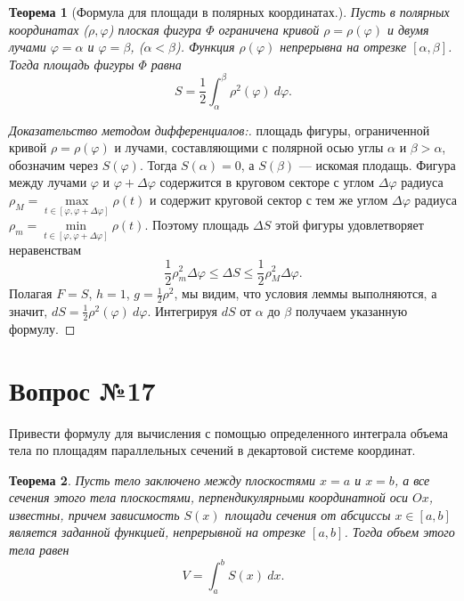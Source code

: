 \documentclass[12pt]{report}
\numberwithin{equation}{section}
\newtheorem{theorem}{Теорема}[section]
\begin{document}
\begin{theorem}[Формула для площади в полярных координатах.] \label{th:16:1}
Пусть в полярных координатах ($\rho, \varphi$) плоская фигура $\Phi$ ограничена кривой $\rho = \rho(\varphi)$ и двумя лучами $\varphi = \alpha$ и $\varphi = \beta$, ($\alpha < \beta$). Функция $\rho(\varphi)$ непрерывна на отрезке $[\alpha, \beta]$. Тогда площадь фигуры $\Phi$ равна
\[ S = \frac{1}{2}\int_{\alpha}^{\beta} \rho^2(\varphi)~d\varphi.\]
\end{theorem}
\begin{proof}[Доказательство методом дифференциалов:] площадь фигуры, ограниченной кривой $\rho = \rho(\varphi)$ и лучами, составляющими с полярной осью углы $\alpha$ и $\beta > \alpha$, обозначим через $S(\varphi)$. Тогда $S(\alpha) = 0$, а $S(\beta)$ --- искомая плодащь. Фигура между лучами $\varphi$ и $\varphi + \Delta \varphi$ содержится в круговом секторе с углом $\Delta \varphi$ радиуса $\rho_M = \max\limits_{t \in [\varphi, \varphi + \Delta \varphi] }\rho(t)$ и содержит круговой сектор с тем же углом $\Delta \varphi$ радиуса $\rho_m = \min\limits_{t \in [\varphi, \varphi + \Delta \varphi]} \rho(t)$. Поэтому площадь $\Delta S$ этой фигуры удовлетворяет неравенствам
\[ \frac{1}{2} \rho^2_m \Delta \varphi \leqslant \Delta S \leqslant \frac{1}{2} \rho^2_M \Delta \varphi.\]
Полагая $F = S$, $h = 1$, $g = \frac{1}{2} \rho^2$, мы видим, что условия леммы выполняются, а значит, $dS = \frac{1}{2} \rho^2(\varphi)~d \varphi$. Интегрируя $dS$ от $\alpha$ до $\beta$ получаем указанную формулу.
\end{proof}

\newpage \section{Вопрос №17} %
\begin{framed}
Привести формулу для вычисления с помощью определенного интеграла объема тела по площадям параллельных сечений в декартовой системе координат.
\end{framed}

\begin{theorem} \label{th:17:1}
Пусть тело заключено между плоскостями $x = a$ и $x = b$, а все сечения этого тела плоскостями, перпендикулярными координатной оси $Ox$, известны, причем зависимость $S(x)$ площади сечения от абсциссы $x \in [a,b]$ является заданной функцией, непрерывной на отрезке $[a,b]$. Тогда объем этого тела равен
\[ V = \int_a^b S(x)~dx.\]
\end{theorem}
\end{document}
